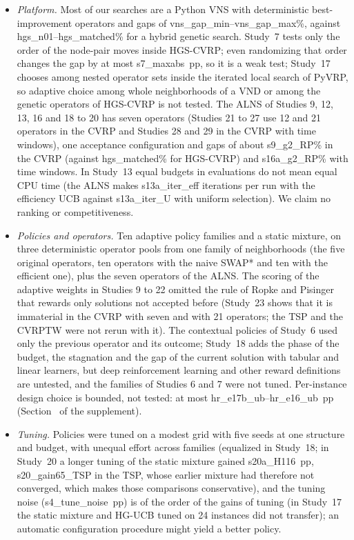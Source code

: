 \begin{itemize}
\item \emph{Platform.} Most of our searches are a Python VNS with deterministic best-improvement operators and gaps of \num{vns_gap_min}--\num{vns_gap_max}\%, against \num{hgs_n01}--\num{hgs_matched}\% for a hybrid genetic search. Study~7 tests only the order of the node-pair moves inside HGS-CVRP; even randomizing that order changes the gap by at most \num{s7_maxabs}~pp, so it is a weak test; Study~17 chooses among nested operator sets inside the iterated local search of PyVRP, so adaptive choice among whole neighborhoods of a VND or among the genetic operators of HGS-CVRP is not tested. The ALNS of Studies 9, 12, 13, 16 and 18 to 20 has seven operators (Studies 21 to 27 use 12 and 21 operators in the CVRP and Studies 28 and 29 in the CVRP with time windows), one acceptance configuration and gaps of about \num{s9_g2_RP}\% in the CVRP (against \num{hgs_matched}\% for HGS-CVRP) and \num{s16a_g2_RP}\% with time windows. In Study~13 equal budgets in evaluations do not mean equal CPU time (the ALNS makes \num{s13a_iter_eff} iterations per run with the efficiency UCB against \num{s13a_iter_U} with uniform selection). We claim no ranking or competitiveness.
\item \emph{Policies and operators.} Ten adaptive policy families and a static mixture, on three deterministic operator pools from one family of neighborhoods (the five original operators, ten operators with the naive SWAP* and ten with the efficient one), plus the seven operators of the ALNS. The scoring of the adaptive weights in Studies 9 to 22 omitted the rule of Ropke and Pisinger that rewards only solutions not accepted before (Study~23 shows that it is immaterial in the CVRP with seven and with 21 operators; the TSP and the CVRPTW were not rerun with it). The contextual policies of Study~6 used only the previous operator and its outcome; Study~18 adds the phase of the budget, the stagnation and the gap of the current solution with tabular and linear learners, but deep reinforcement learning and other reward definitions are untested, and the families of Studies 6 and 7 were not tuned. Per-instance design choice is bounded, not tested: at most \num{hr_e17b_ub}--\num{hr_e16_ub}~pp (Section~ of the supplement).
\item \emph{Tuning.} Policies were tuned on a modest grid with five seeds at one structure and budget, with unequal effort across families (equalized in Study~18; in Study~20 a longer tuning of the static mixture gained \num{s20a_H116}~pp, \num{s20_gain65_TSP} in the TSP, whose earlier mixture had therefore not converged, which makes those comparisons conservative), and the tuning noise (\num{s4_tune_noise}~pp) is of the order of the gains of tuning (in Study~17 the static mixture and HG-UCB tuned on 24 instances did not transfer); an automatic configuration procedure \citep{lopezibanez2016} might yield a better policy.

\end{itemize}
